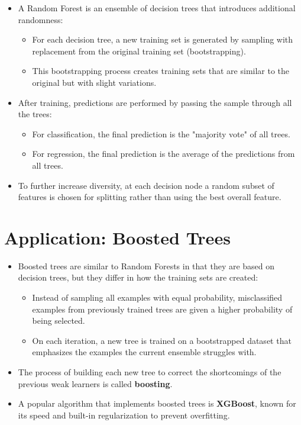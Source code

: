 \documentclass[10pt]{article}
\begin{document}
\begin{itemize}
    \item A Random Forest is an ensemble of decision trees that introduces additional randomness:
    \begin{itemize}
        \item For each decision tree, a new training set is generated by sampling with replacement from the original training set (bootstrapping).
        \item This bootstrapping process creates training sets that are similar to the original but with slight variations.
    \end{itemize}
    \item After training, predictions are performed by passing the sample through all the trees:
    \begin{itemize}
        \item For classification, the final prediction is the "majority vote" of all trees.
        \item For regression, the final prediction is the average of the predictions from all trees.
    \end{itemize}
    \item To further increase diversity, at each decision node a random subset of features is chosen for splitting rather than using the best overall feature.
\end{itemize}

\section{Application: Boosted Trees}

\begin{itemize}
    \item Boosted trees are similar to Random Forests in that they are based on decision trees, but they differ in how the training sets are created:
    \begin{itemize}
        \item Instead of sampling all examples with equal probability, misclassified examples from previously trained trees are given a higher probability of being selected.
        \item On each iteration, a new tree is trained on a bootstrapped dataset that emphasizes the examples the current ensemble struggles with.
    \end{itemize}
    \item The process of building each new tree to correct the shortcomings of the previous weak learners is called \textbf{boosting}.
    \item A popular algorithm that implements boosted trees is \textbf{XGBoost}, known for its speed and built-in regularization to prevent overfitting.
\end{itemize}
\end{document}
